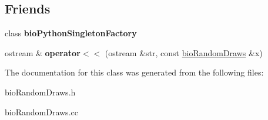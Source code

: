 \subsection*{Friends}
\begin{DoxyCompactItemize}
\item 
\mbox{\label{classbio_random_draws_a7112c3c569ac638826c63fda15012746}} 
class {\bfseries bio\+Python\+Singleton\+Factory}
\item 
\mbox{\label{classbio_random_draws_a13803102133b3a4b93986d8fd8fcc081}} 
ostream \& {\bfseries operator$<$$<$} (ostream \&str, const \hyperlink{classbio_random_draws}{bio\+Random\+Draws} \&x)
\end{DoxyCompactItemize}


The documentation for this class was generated from the following files\+:\begin{DoxyCompactItemize}
\item 
bio\+Random\+Draws.\+h\item 
bio\+Random\+Draws.\+cc\end{DoxyCompactItemize}
